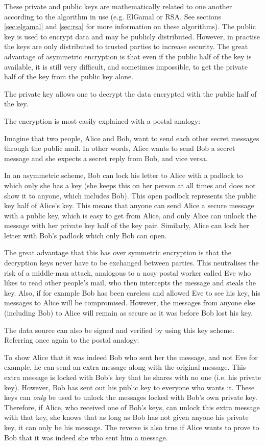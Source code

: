 These private and public keys are mathematically related to one another
according to the algorithm in use (e.g. ElGamal or RSA. See sections
\ref{sec:elgamal} and \ref{sec:rsa} for more information on these algorithms).
The public key is used to encrypt data and may be publicly distributed. However,
in practise the keys are only distributed to trusted parties to increase security.
The great advantage of asymmetric encryption is that even if the public half of the key is
available, it is still very difficult, and sometimes impossible, to get the
private half of the key from the public key alone.

The private key allows one to decrypt the data encrypted with the public half of the key.

The encryption is most easily explained with a postal analogy:

Imagine that two people, Alice and Bob, want to send each other secret messages through
the public mail. In other words, Alice wants to send Bob a secret message and she expects
a secret reply from Bob, and vice versa. 

In an asymmetric scheme, Bob can lock his letter to Alice with a padlock to which only she has
a key (she keeps this on her person at all times and does not show it to anyone, which
includes Bob). This open padlock represents the public key half of Alice's key. This
means that anyone can send Alice a secure message with a public key, which is easy to
get from Alice, and only Alice can unlock the message with her private key half of the
key pair. Similarly, Alice can lock her letter with Bob's padlock which only Bob can open.

The great advantage that this has over symmetric encryption is that the decryption keys never
have to be exchanged between parties. This neutralises the risk of a middle-man attack,
analogous to a nosy postal worker called Eve who likes to read other people's
mail, who then intercepts the message and steals the key. Also, if for example Bob has
been careless and allowed Eve to see his key, his messages to Alice will be
compromised. However, the messages from anyone else (including Bob) to Alice
will remain as secure as it was before Bob lost his key.

The data source can also be signed and verified by using this key scheme. Referring once again
to the postal analogy:

To show Alice that it was indeed Bob who sent her the message, and not Eve for example, he can
send an extra message along with the original message. This extra message is locked with Bob's
key that he shares with no one (i.e. his private key). However, Bob has sent out his
public key to everyone who wants it. These keys can \emph{only} be used to unlock
the messages locked with Bob's own private key. Therefore, if Alice, who received one of Bob's keys, can unlock this extra
message with that key, she knows that as long as Bob has not given anyone his
private key, it can only be his message. The reverse is also true if Alice
wants to prove to Bob that it was indeed she who sent him a message. 

